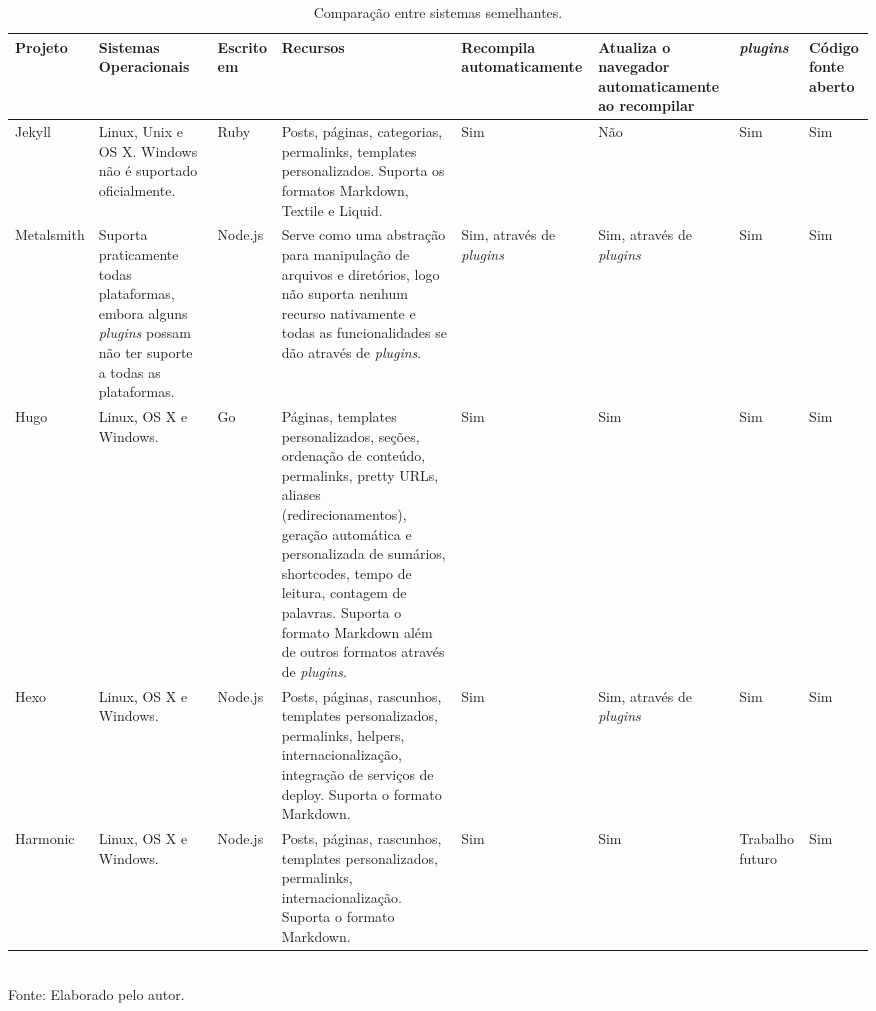 \documentclass[ppginf, pep]{esinucpel}
\begin{document}
\begin{landscape}
    \begin{table}[H]
        \centering
        \caption{Comparação entre sistemas semelhantes.}
        \vspace{5pt}
        \small
        \begin{tabular}{ | p{2cm} | p{3.5cm} | l | p{7.5cm} | p{1.6cm} | p{2cm} | p{1.5cm} | p{1.3cm} |}
        \hline
        Projeto & Sistemas Operacionais & Escrito em & Recursos & Recompila automaticamente & Atualiza o navegador automaticamente ao recompilar & \textit{plugins} & Código fonte aberto \\ \hline
        Jekyll & Linux, Unix e OS X. Windows não é suportado oficialmente. & Ruby & Posts, páginas, categorias, permalinks, templates personalizados. Suporta os formatos Markdown, Textile e Liquid. & Sim & Não & Sim & Sim \\ \hline
        Metalsmith & Suporta praticamente todas plataformas, embora alguns \textit{plugins} possam não ter suporte a todas as plataformas. & Node.js & Serve como uma abstração para manipulação de arquivos e diretórios, logo não suporta nenhum recurso nativamente e todas as funcionalidades se dão através de \textit{plugins}. & Sim, através de \textit{plugins} & Sim, através de \textit{plugins} & Sim & Sim \\ \hline
        Hugo & Linux, OS X e Windows. & Go & Páginas, templates personalizados, seções, ordenação de conteúdo, permalinks, pretty URLs, aliases (redirecionamentos), geração automática e personalizada de sumários, shortcodes, tempo de leitura, contagem de palavras. Suporta o formato Markdown além de outros formatos através de \textit{plugins}. & Sim & Sim & Sim & Sim \\ \hline
        Hexo & Linux, OS X e Windows. & Node.js & Posts, páginas, rascunhos, templates personalizados, permalinks, helpers, internacionalização, integração de  serviços de deploy. Suporta o formato Markdown. & Sim & Sim, através de \textit{plugins} & Sim & Sim \\
        \hline
        Harmonic & Linux, OS X e Windows. & Node.js & Posts, páginas, rascunhos, templates personalizados, permalinks, internacionalização. Suporta o formato Markdown. & Sim & Sim & Trabalho futuro & Sim \\
        \hline
        \end{tabular}
        \normalsize
        \vspace{5pt}
        \\Fonte: Elaborado pelo autor.
        \label{table:comparacao_sistemas}
    \end{table}
\end{landscape}
\end{document}
